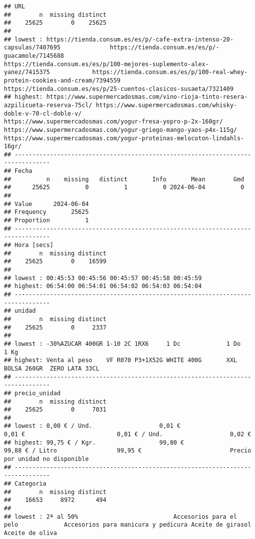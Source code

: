 \documentclass[
]{article}
\begin{document}
\begin{verbatim}
## URL 
##        n  missing distinct 
##    25625        0    25625 
## 
## lowest : https://tienda.consum.es/es/p/-cafe-extra-intenso-20-capsulas/7407695              https://tienda.consum.es/es/p/-guacamole/7145688                                   https://tienda.consum.es/es/p/100-mejores-suplemento-alex-yanez/7415375            https://tienda.consum.es/es/p/100-real-whey-protein-cookies-and-cream/7394559      https://tienda.consum.es/es/p/25-cuentos-clasicos-susaeta/7321409                 
## highest: https://www.supermercadosmas.com/vino-rioja-tinto-resera-azpilicueta-reserva-75cl/ https://www.supermercadosmas.com/whisky-doble-v-70-cl-doble-v/                     https://www.supermercadosmas.com/yogur-fresa-yopro-p-2x-160gr/                     https://www.supermercadosmas.com/yogur-griego-mango-yaos-p4x-115g/                 https://www.supermercadosmas.com/yogur-proteinas-melocoton-lindahls-16gr/         
## --------------------------------------------------------------------------------
## Fecha 
##          n    missing   distinct       Info       Mean        Gmd 
##      25625          0          1          0 2024-06-04          0 
##                      
## Value      2024-06-04
## Frequency       25625
## Proportion          1
## --------------------------------------------------------------------------------
## Hora [secs] 
##        n  missing distinct 
##    25625        0    16599 
## 
## lowest : 00:45:53 00:45:56 00:45:57 00:45:58 00:45:59
## highest: 06:54:00 06:54:01 06:54:02 06:54:03 06:54:04
## --------------------------------------------------------------------------------
## unidad 
##        n  missing distinct 
##    25625        0     2337 
## 
## lowest : -30%AZUCAR 400GR 1-10 2C 1RX6     1 Dc             1 Do             1 Kg            
## highest: Venta al peso    VF R070 P3+1X52G WHITE 400G       XXL BOLSA 260GR  ZERO LATA 33CL  
## --------------------------------------------------------------------------------
## precio_unidad 
##        n  missing distinct 
##    25625        0     7031 
## 
## lowest : 0,00 € / Und.                   0,01 €                          0,01 €                          0,01 € / Und.                   0,02 €                         
## highest: 99,75 € / Kgr.                  99,80 €                         99,88 € / Litro                 99,95 €                         Precio por unidad no disponible
## --------------------------------------------------------------------------------
## Categoria 
##        n  missing distinct 
##    16653     8972      494 
## 
## lowest : 2ª al 50%                           Accesorios para el pelo             Accesorios para manicura y pedicura Aceite de girasol                   Aceite de oliva                    

\end{verbatim}
\end{document}
